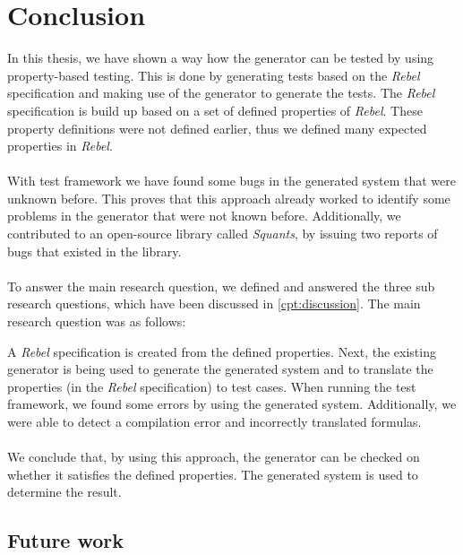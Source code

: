 \chapter{Conclusion}
\label{chp:conclusion}
In this thesis, we have shown a way how the generator can be tested by using property-based testing. This is done by generating tests based on the \textit{Rebel} specification and making use of the generator to generate the tests. The \textit{Rebel} specification is build up based on a set of defined properties of \textit{Rebel}. These property definitions were not defined earlier, thus we defined many expected properties in \textit{Rebel}.\\
\\
With test framework we have found some bugs in the generated system that were unknown before. This proves that this approach already worked to identify some problems in the generator that were not known before. Additionally, we contributed to an open-source library called \textit{Squants}, by issuing two reports of bugs that existed in the library.\\
\\
To answer the main research question, we defined and answered the three sub research questions, which have been discussed in \autoref{cpt:discussion}. The main research question was as follows:
\begin{quote}
\rqMain
\end{quote}
A \textit{Rebel} specification is created from the defined properties. Next, the existing generator is being used to generate the generated system and to translate the properties (in the \textit{Rebel} specification) to test cases. When running the test framework, we found some errors by using the generated system. Additionally, we were able to detect a compilation error and incorrectly translated formulas.\\
\\
We conclude that, by using this approach, the generator can be checked on whether it satisfies the defined properties. The generated system is used to determine the result.

\section{Future work}

